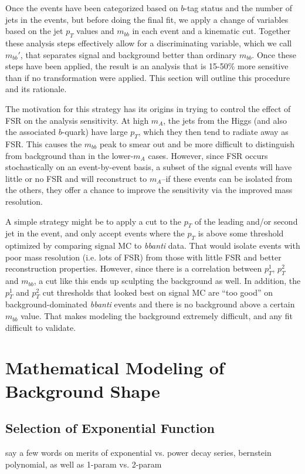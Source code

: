 Once the events have been categorized based on $b$-tag status and the number of jets in the
events, but before doing the final fit, we apply a change of variables based on the jet
$p_T$ values and $m_{bb}$ in each event and a kinematic cut.  Together these analysis 
steps effectively allow for a discriminating variable, which we call $m_{bb}'$, that
separates signal and background better than ordinary $m_{bb}$.  Once these steps have
been applied, the result is an analysis that is 15-50\% more sensitive
than if no transformation were applied.  This section will 
outline this procedure and its rationale.  

The motivation for this strategy has its origins in trying to control the effect of
FSR on the analysis sensitivity.  At high $m_A$, the jets from the Higgs (and also 
the associated $b$-quark) have large $p_T$, which they then tend to radiate away 
as FSR.  This causes the $m_{bb}$ peak to smear out and be more difficult to 
distinguish from background than in the lower-$m_A$ cases.  However, since FSR
occurs stochastically on an event-by-event basis, a subset of the signal events
will have little or no FSR and will reconstruct to $m_A$--if these events 
can be isolated from the others, they offer a chance to improve the sensitivity
via the improved mass resolution.  

A simple strategy might be to apply a cut to the $p_T$ of the leading and/or 
second jet in the event, and only accept events where the $p_T$ is above some
threshold optimized by comparing signal MC to \textit{bbanti} data.  
That would isolate events with poor mass resolution (i.e. lots of FSR) from
those with little FSR and better reconstruction properties.  However, since
there is a correlation between $p_T^1$, $p_T^2$ and $m_{bb}$, a cut like
this ends up sculpting the background as well.  In addition, the $p_T^1$ and
$p_T^2$ cut thresholds that looked best on signal MC are ``too good'' on 
background-dominated \textit{bbanti} events and there is no background
above a certain $m_{bb}$ value.  That makes modeling the background extremely 
difficult, and any fit difficult to validate.  






\section{Mathematical Modeling of Background Shape}
\subsection{Selection of Exponential Function}
say a few words on merits of exponential vs. power decay series,
bernstein polynomial, as well as 1-param vs. 2-param


